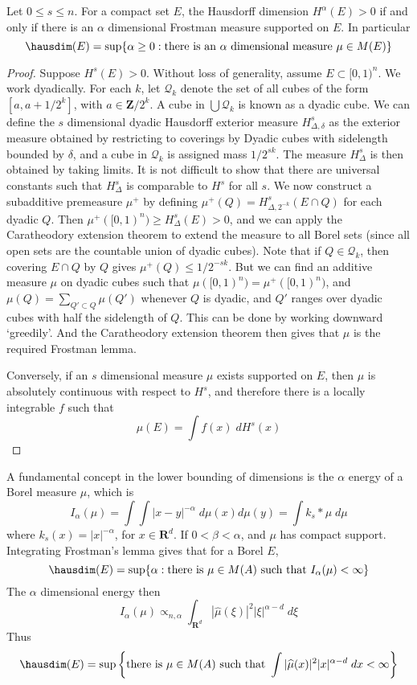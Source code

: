 \begin{theorem}
	Let $0 \leq s \leq n$. For a compact set $E$, the Hausdorff dimension $H^\alpha(E) > 0$ if and only if there is an $\alpha$ dimensional Frostman measure supported on $E$. In particular
	\[ \hausdim(E) = \sup \{ \alpha \geq 0: \text{there is an $\alpha$ dimensional measure}\ \mu \in M(E) \} \]
\end{theorem}
\begin{proof}
	Suppose $H^s(E) > 0$. Without loss of generality, assume $E \subset [0,1)^n$. We work dyadically. For each $k$, let $\mathcal{Q}_k$ denote the set of all cubes of the form $[a,a+1/2^k]$, with $a \in \mathbf{Z}/2^k$. A cube in $\bigcup \mathcal{Q}_k$ is known as a dyadic cube. We can define the $s$ dimensional dyadic Hausdorff exterior measure $H^s_{\Delta,\delta}$ as the exterior measure obtained by restricting to coverings by Dyadic cubes with sidelength bounded by $\delta$, and a cube in $\mathcal{Q}_k$ is assigned mass $1/2^{sk}$. The measure $H^s_\Delta$ is then obtained by taking limits. It is not difficult to show that there are universal constants such that $H^s_\Delta$ is comparable to $H^s$ for all $s$. We now construct a subadditive premeasure $\mu^+$ by defining $\mu^+(Q) = H^s_{\Delta,2^{-k}}(E \cap Q)$ for each dyadic $Q$. Then $\mu^+([0,1)^n) \geq H^s_\Delta(E) > 0$, and we can apply the Caratheodory extension theorem to extend the measure to all Borel sets (since all open sets are the countable union of dyadic cubes). Note that if $Q \in \mathcal{Q}_k$, then covering $E \cap Q$ by $Q$ gives $\mu^+(Q) \leq 1/2^{-sk}$. But we can find an additive measure $\mu$ on dyadic cubes such that $\mu([0,1)^n) = \mu^+([0,1)^n)$, and $\mu(Q) = \sum_{Q' \subset Q} \mu(Q')$ whenever $Q$ is dyadic, and $Q'$ ranges over dyadic cubes with half the sidelength of $Q$. This can be done by working downward `greedily'. And the Caratheodory extension theorem then gives that $\mu$ is the required Frostman lemma.

	Conversely, if an $s$ dimensional measure $\mu$ exists supported on $E$, then $\mu$ is absolutely continuous with respect to $H^s$, and therefore there is a locally integrable $f$ such that
	\[ \mu(E) = \int f(x)\; dH^s(x) \]
\end{proof}

A fundamental concept in the lower bounding of dimensions is the $\alpha$ energy of a Borel measure $\mu$, which is
%
\[ I_\alpha(\mu) = \int \int |x-y|^{-\alpha}\; d\mu(x) d\mu(y) = \int k_s * \mu\; d\mu \]
%
where $k_s(x) = |x|^{-\alpha}$, for $x \in \mathbf{R}^d$. If $0 < \beta < \alpha$, and $\mu$ has compact support. Integrating Frostman's lemma gives that for a Borel $E$,
%
\[ \hausdim(E) = \sup \{ \alpha: \text{there is}\ \mu \in M(A)\ \text{such that}\ I_\alpha(\mu) < \infty \} \]
%
The $\alpha$ dimensional energy then
%
\[ I_\alpha(\mu) \propto_{n,\alpha} \int_{\mathbf{R}^d} |\widehat{\mu}(\xi)|^2 |\xi|^{\alpha-d}\; d\xi \]
%
Thus
%
\[ \hausdim(E) = \sup \left\{ \text{there is}\ \mu \in M(A)\ \text{such that}\ \int |\widehat{\mu}(x)|^2 |x|^{\alpha-d}\; dx < \infty \right\} \]

